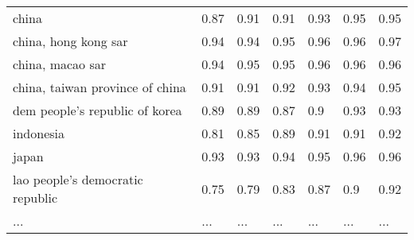 \begin{table}
\begin{tabular}[t]{lllllll}
china & 0.87 & 0.91 & 0.91 & 0.93 & 0.95 & 0.95\\
china, hong kong sar & 0.94 & 0.94 & 0.95 & 0.96 & 0.96 & 0.97\\
china, macao sar & 0.94 & 0.95 & 0.95 & 0.96 & 0.96 & 0.96\\
china, taiwan province of china & 0.91 & 0.91 & 0.92 & 0.93 & 0.94 & 0.95\\
\addlinespace
dem people's republic of korea & 0.89 & 0.89 & 0.87 & 0.9 & 0.93 & 0.93\\
indonesia & 0.81 & 0.85 & 0.89 & 0.91 & 0.91 & 0.92\\
japan & 0.93 & 0.93 & 0.94 & 0.95 & 0.96 & 0.96\\
lao people's democratic republic & 0.75 & 0.79 & 0.83 & 0.87 & 0.9 & 0.92\\
... & ... & ... & ... & ... & ... & ...\\
\bottomrule
\end{tabular}
\end{table}
